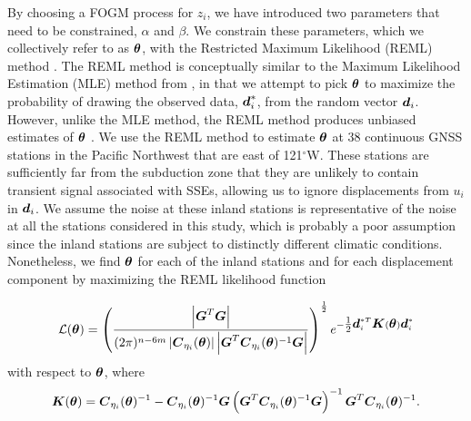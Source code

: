 \documentclass[extra,mreferee]{gji}
\begin{document}
By choosing a FOGM process for $z_i$, we have introduced two
parameters that need to be constrained, $\alpha$ and $\beta$. We
constrain these parameters, which we collectively refer to as
$\mitbf{\theta}$, with the Restricted Maximum Likelihood (REML) method
\citep{Harville1974}. The REML method is conceptually similar to the
Maximum Likelihood Estimation (MLE) method from \citet{Langbein1997},
in that we attempt to pick $\mitbf{\theta}$ to maximize the
probability of drawing the observed data, $\mitbf{d}_i^*$, from the
random vector $\mitbf{d}_i$. However, unlike the MLE method, the REML
method produces unbiased estimates of $\mitbf{\theta}$ \citep[sec.
2.6]{Cressie1992}. We use the REML method to estimate $\mitbf{\theta}$
at 38 continuous GNSS stations in the Pacific Northwest that are east
of 121$^\circ$W. These stations are sufficiently far from the
subduction zone that they are unlikely to contain transient signal
associated with SSEs, allowing us to ignore displacements from $u_i$
in $\mitbf{d}_i$. We assume the noise at these inland stations is
representative of the noise at all the stations considered in this
study, which is probably a poor assumption since the inland stations
are subject to distinctly different climatic conditions. Nonetheless,
we find $\mitbf{\theta}$ for each of the inland stations and for each
displacement component by maximizing the REML likelihood function

\begin{equation}\label{eq:REML}
\mathcal{L}(\mitbf{\theta}) = \left(\frac{\left|\G^T\G\right|}{(2\pi)^{n-6m} 
                                    \left| \mitbf{C}_{\eta_i}(\mitbf{\theta}) \right| 
                                    \left| \G^T\mitbf{C}_{\eta_i}(\mitbf{\theta})^{-1}\G \right|}\right)^{\frac{1}{2}} 
                              e^{-\tfrac{1}{2}\data_i^{*T}\mitbf{K}(\mitbf{\theta})\data_i^*}
\end{equation}
with respect to $\mitbf{\theta}$, where
\begin{equation}
\mitbf{K}(\mitbf{\theta}) = \mitbf{C}_{\eta_i}(\mitbf{\theta})^{-1} - 
                            \mitbf{C}_{\eta_i}(\mitbf{\theta})^{-1}\G
                            \left(\G^T\mitbf{C}_{\eta_i}(\mitbf{\theta})^{-1}\G\right)^{-1}
                            \G^T\mitbf{C}_{\eta_i}(\mitbf{\theta})^{-1}.
\end{equation}

\end{document}
